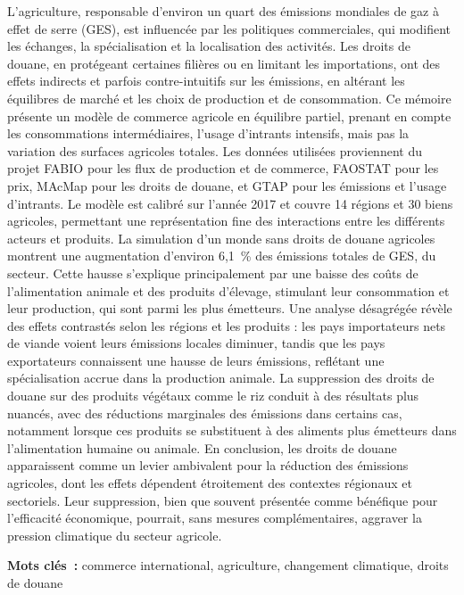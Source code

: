 L’agriculture, responsable d’environ un quart des émissions mondiales de gaz à effet de serre (GES), est influencée par les politiques commerciales, qui modifient les échanges, la spécialisation et la localisation des activités. Les droits de douane, en protégeant certaines filières ou en limitant les importations, ont des effets indirects et parfois contre-intuitifs sur les émissions, en altérant les équilibres de marché et les choix de production et de consommation. Ce mémoire présente un modèle de commerce agricole en équilibre partiel, prenant en compte les consommations intermédiaires, l'usage d'intrants intensifs, mais pas la variation des surfaces agricoles totales. Les données utilisées proviennent du projet FABIO pour les flux de production et de commerce, FAOSTAT pour les prix, MAcMap pour les droits de douane, et GTAP pour les émissions et l’usage d’intrants. Le modèle est calibré sur l’année 2017 et couvre 14 régions et 30 biens agricoles, permettant une représentation fine des interactions entre les différents acteurs et produits. La simulation d'un monde sans droits de douane agricoles montrent une augmentation d’environ 6,1~\% des émissions totales de GES, du secteur. Cette hausse s’explique principalement par une baisse des coûts de l’alimentation animale et des produits d’élevage, stimulant leur consommation et leur production, qui sont parmi les plus émetteurs. Une analyse désagrégée révèle des effets contrastés selon les régions et les produits : les pays importateurs nets de viande voient leurs émissions locales diminuer, tandis que les pays exportateurs connaissent une hausse de leurs émissions, reflétant une spécialisation accrue dans la production animale. La suppression des droits de douane sur des produits végétaux comme le riz conduit à des résultats plus nuancés, avec des réductions marginales des émissions dans certains cas, notamment lorsque ces produits se substituent à des aliments plus émetteurs dans l’alimentation humaine ou animale. En conclusion, les droits de douane apparaissent comme un levier ambivalent pour la réduction des émissions agricoles, dont les effets dépendent étroitement des contextes régionaux et sectoriels. Leur suppression, bien que souvent présentée comme bénéfique pour l’efficacité économique, pourrait, sans mesures complémentaires, aggraver la pression climatique du secteur agricole.

\textbf{Mots clés~:} commerce international, agriculture, changement climatique, droits de douane
